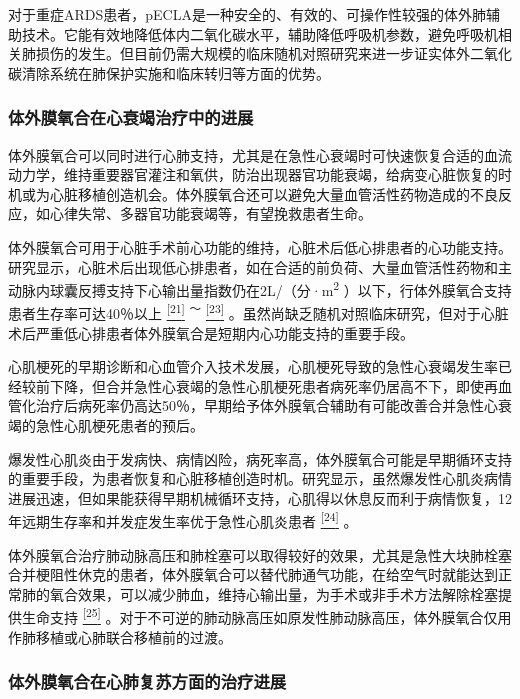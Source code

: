 对于重症ARDS患者，pECLA是一种安全的、有效的、可操作性较强的体外肺辅助技术。它能有效地降低体内二氧化碳水平，辅助降低呼吸机参数，避免呼吸机相关肺损伤的发生。但目前仍需大规模的临床随机对照研究来进一步证实体外二氧化碳清除系统在肺保护实施和临床转归等方面的优势。

\subsubsection{体外膜氧合在心衰竭治疗中的进展}

体外膜氧合可以同时进行心肺支持，尤其是在急性心衰竭时可快速恢复合适的血流动力学，维持重要器官灌注和氧供，防治出现器官功能衰竭，给病变心脏恢复的时机或为心脏移植创造机会。体外膜氧合还可以避免大量血管活性药物造成的不良反应，如心律失常、多器官功能衰竭等，有望挽救患者生命。

体外膜氧合可用于心脏手术前心功能的维持，心脏术后低心排患者的心功能支持。研究显示，心脏术后出现低心排患者，如在合适的前负荷、大量血管活性药物和主动脉内球囊反搏支持下心输出量指数仍在2L/（分·m\textsuperscript{2}
）以下，行体外膜氧合支持患者生存率可达40％以上
\protect\hyperlink{text00030.htmlux5cux23ch21-29}{\textsuperscript{{[}21{]}}}
\textsuperscript{～}
\protect\hyperlink{text00030.htmlux5cux23ch23-29}{\textsuperscript{{[}23{]}}}
。虽然尚缺乏随机对照临床研究，但对于心脏术后严重低心排患者体外膜氧合是短期内心功能支持的重要手段。

心肌梗死的早期诊断和心血管介入技术发展，心肌梗死导致的急性心衰竭发生率已经较前下降，但合并急性心衰竭的急性心肌梗死患者病死率仍居高不下，即使再血管化治疗后病死率仍高达50％，早期给予体外膜氧合辅助有可能改善合并急性心衰竭的急性心肌梗死患者的预后。

爆发性心肌炎由于发病快、病情凶险，病死率高，体外膜氧合可能是早期循环支持的重要手段，为患者恢复和心脏移植创造时机。研究显示，虽然爆发性心肌炎病情进展迅速，但如果能获得早期机械循环支持，心肌得以休息反而利于病情恢复，12年远期生存率和并发症发生率优于急性心肌炎患者
\protect\hyperlink{text00030.htmlux5cux23ch24-29}{\textsuperscript{{[}24{]}}}
。

体外膜氧合治疗肺动脉高压和肺栓塞可以取得较好的效果，尤其是急性大块肺栓塞合并梗阻性休克的患者，体外膜氧合可以替代肺通气功能，在给空气时就能达到正常肺的氧合效果，可以减少肺血，维持心输出量，为手术或非手术方法解除栓塞提供生命支持
\protect\hyperlink{text00030.htmlux5cux23ch25-29}{\textsuperscript{{[}25{]}}}
。对于不可逆的肺动脉高压如原发性肺动脉高压，体外膜氧合仅用作肺移植或心肺联合移植前的过渡。

\subsubsection{体外膜氧合在心肺复苏方面的治疗进展}

